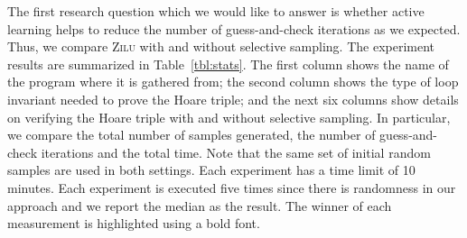 


The first research question which we would like to answer is whether active learning helps to reduce the number of guess-and-check iterations as we expected. Thus, we compare \textsc{Zilu} with and without selective sampling. The experiment results are summarized in Table~\ref{tbl:stats}. The first column shows the name of the program where it is gathered from; the second column shows the type of loop invariant needed to prove the Hoare triple; and the next six columns show details on verifying the Hoare triple with and without selective sampling. In particular, we compare the total number of samples generated, the number of guess-and-check iterations and the total time. Note that the same set of initial random samples are used in both settings. Each experiment has a time limit of 10 minutes. Each experiment is executed five times since there is randomness in our approach and we report the median as the result. The winner of each measurement is highlighted using a bold font.

